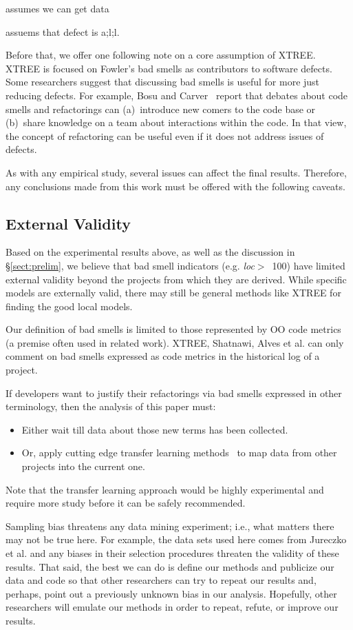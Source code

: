 \documentclass[twocolumn,5p]{elsarticle}
\newcommand{\tion}[1]{\S\ref{sect:#1}}
\theoremstyle{break}
\begin{document}
\begin{itemize}
{assumes we can get data

assuems that defect is a;l;l.



Before  that, we offer one following note on a
core assumption of XTREE.
XTREE   is focused on Fowler's bad smells
as contributors to software defects. Some researchers 
 suggest that discussing bad smells is useful for more just reducing defects. For example, Bosu and Carver~\cite{bosu13} report that
debates about code smells and refactorings can (a)~introduce new comers to the code base or (b)~share knowledge on a team
about interactions within the code. In that view, 
the concept of refactoring can be useful
even if it does not address issues of defects. 


As with any empirical study, several issues can affect the final results. Therefore, any
conclusions made from this work must be offered with the following
caveats.

\subsection{External Validity}
Based on the experimental results above,
as well as the discussion in \tion{prelim},
we believe that bad smell indicators (e.g. \mbox{{\em loc}$>$ 100})
have limited external validity beyond the projects from which they are derived. 
While specific models are externally valid,
there may still be general methods like XTREE for finding the good local models.  


Our definition of bad smells is limited to those represented by OO code metrics (a premise often used in related work).   
XTREE, Shatnawi, Alves et al. can  only comment
on bad smells   expressed as code metrics 
  in the historical log of a project. 


If developers want to justify their refactorings
via bad smells expressed in other terminology,
then the  analysis of this paper must:
\begin{itemize}
    \item Either wait till 
data about those new
terms has been collected. 
\item Or, apply cutting edge transfer learning
methods~\cite{Nam15,Jing15} to map data from other projects
into the current one.
\end{itemize}
Note that the transfer learning approach would
be highly experimental and require more study
before it can be safely recommended.

Sampling bias threatens any data mining experiment; i.e., what matters
there may not be true here. For example, the data sets used here comes from Jureczko et al. and any biases in their selection procedures
threaten the validity of these results. 
That said,
the best we can do is define our methods and publicize our data and code so that other researchers can
try to repeat our results and, perhaps, point out a previously unknown bias
in our analysis. Hopefully, other researchers will emulate our methods in
order to repeat, refute, or improve our results. 

}
\end{itemize}
\end{document}
